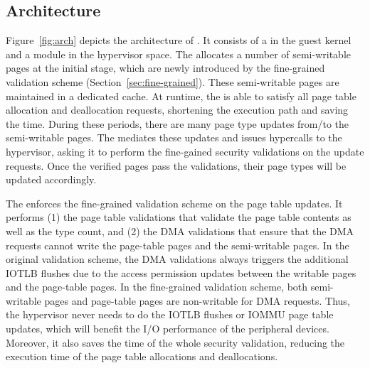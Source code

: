 \subsection{\name Architecture}
Figure~\ref{fig:arch} depicts the architecture of \name. It consists of a \cache in the guest kernel and a \name module in the hypervisor space.
The \cache allocates a number of semi-writable pages at the initial stage,  which are newly introduced by the fine-grained validation scheme (Section~\ref{sec:fine-grained}).
These semi-writable pages are maintained in a dedicated cache.
At runtime, the \cache is able to satisfy all page table allocation and deallocation requests, shortening the execution path and saving the time.
During these periods, there are many page type updates from/to the semi-writable pages.
The \cache mediates these updates and issues hypercalls to the hypervisor, asking it to perform the fine-gained security validations on the update requests.
Once the verified pages pass the validations, their page types will be updated accordingly.

The \module enforces the fine-grained validation scheme on the page table updates.
It performs (1) the page table validations that validate the page table contents as well as the type count, and (2) the DMA validations that ensure that the DMA requests cannot write the page-table pages and the semi-writable pages.
In the original validation scheme, the DMA validations always triggers the additional IOTLB flushes due to the access permission updates between the writable pages and the page-table pages.
In the fine-grained validation scheme, both semi-writable pages and page-table pages are non-writable for DMA requests.
Thus, the hypervisor never needs to do the IOTLB flushes or IOMMU page table updates, which will benefit the I/O performance of the peripheral devices.
Moreover, it also saves the time of the whole security validation, reducing the execution time of the page table allocations and deallocations.

